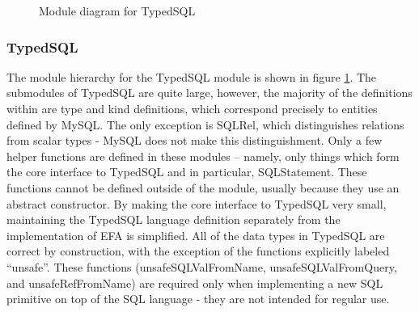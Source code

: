 \begin{figure}[!ht]
{{
   }}\caption{Module diagram for TypedSQL} \label{fig:typedSQL}
\end{figure}
    
    
\subsubsection{TypedSQL}
The module hierarchy for the TypedSQL module is shown in
figure \ref{fig:typedSQL}. The submodules of TypedSQL are quite large, 
however,
the majority of the definitions within are type and kind definitions, which 
correspond 
precisely to entities defined by MySQL. The only exception is SQLRel, which 
distinguishes
relations from scalar types - MySQL does not make this distinguishment. 
Only a few
helper functions are defined in these modules -- namely, only things which 
form
the core interface to TypedSQL and in particular, SQLStatement. These 
functions
cannot be defined outside of the module, usually because they use an 
abstract
constructor. By making the core interface to TypedSQL very small, 
maintaining 
the TypedSQL language definition separately from the implementation of 
EFA is simplified. All of the data types in TypedSQL are correct by 
construction, with the exception of the functions explicitly labeled 
``unsafe''.
These functions (unsafeSQLValFromName, unsafeSQLValFromQuery, and 
unsafeRefFromName)
are required only when implementing a new SQL primitive on top of the SQL
language - they are not intended for regular use. 

